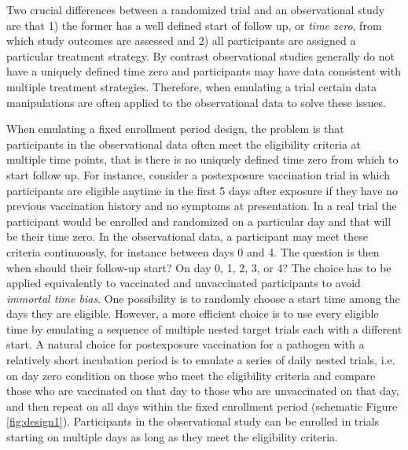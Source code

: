 \begin{appendix}
    Two crucial differences between a randomized trial and an observational study are that 1) the former has a well defined start of follow up, or \textit{time zero}, from which study outcomes are assessed and 2) all participants are assigned a particular treatment strategy. By contrast observational studies generally do not have a uniquely defined time zero and participants may have data consistent with multiple treatment strategies. Therefore, when emulating a trial certain data manipulations are often applied to the observational data to solve these issues. 

    When emulating a fixed enrollment period design, the problem is that participants in the observational data often meet the eligibility criteria at multiple time points, that is there is no uniquely defined time zero from which to start follow up. For instance, consider a postexposure vaccination trial in which participants are eligible anytime in the first 5 days after exposure if they have no previous vaccination history and no symptoms at presentation. In a real trial the participant would be enrolled and randomized on a particular day and that will be their time zero. In the observational data, a participant may meet these criteria continuously, for instance between days 0 and 4. The question is then when should their follow-up start? On day 0, 1, 2, 3, or 4? The choice has to be applied equivalently to vaccinated and unvaccinated participants to avoid \textit{immortal time bias}. One possibility is to randomly choose a start time among the days they are eligible. However, a more efficient choice is to use every eligible time by emulating a sequence of multiple nested target trials each with a different start. A natural choice for postexposure vaccination for a pathogen with a relatively short incubation period is to emulate a series of daily nested trials, i.e. on day zero condition on those who meet the eligibility criteria and compare those who are vaccinated on that day to those who are unvaccinated on that day, and then repeat on all days within the fixed enrollment period (schematic Figure \ref{fig:design1}). Participants in the observational study can be enrolled in trials starting on multiple days as long as they meet the eligibility criteria.
    

\end{appendix}
